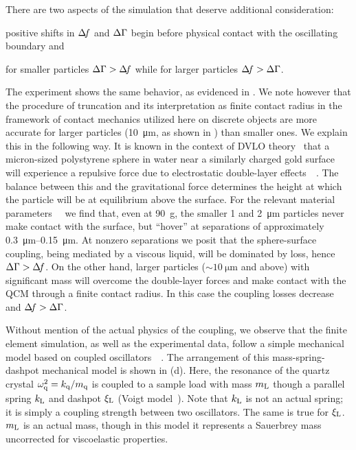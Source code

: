 There are two aspects of the simulation that deserve additional
consideration:
\begin{inparaenum}[(1)]
\item positive shifts in $\Delta\!f$ and $\Delta\Gamma$ begin 
before physical contact with the oscillating boundary and 
\item for smaller particles $\Delta\Gamma>\Delta\!f$ while for
larger particles $\Delta\!f>\Delta\Gamma$.
\end{inparaenum}
The experiment shows the same behavior, as evidenced in
.  We note however that the procedure of truncation
and its interpretation as finite contact radius in the framework of contact
mechanics utilized here on discrete objects are more accurate for larger
particles (\SI{10}{\micro\meter}, as shown in )
than smaller ones.  We explain this in the following way.
It is known in
the context of DVLO theory~\cite{israelachvili2011intermolecular} that a
micron-sized polystyrene sphere in water near a similarly charged gold
surface will experience a repulsive force due to electrostatic double-layer
effects~\cite{alexander1987hydrodynamic}~\cite{flicker1993quantifying}.
The balance between this and the gravitational force determines the height
at which the particle will be at equilibrium above the surface.  For the
relevant material
parameters~\cite{israelachvili2011intermolecular}~\cite{sharma1992factors}
we find that, even at \SI{90}{g}, the smaller \num{1} and
\SI{2}{\micro\meter} particles never make contact with the surface, but
``hover'' at separations of approximately
\SIrange{0.3}{0.15}{\micro\meter}.  At nonzero separations we posit that
the sphere-surface coupling, being mediated by a viscous liquid, will be
dominated by loss, hence $\Delta\Gamma>\Delta\!f$.  On the other hand, larger particles
($\sim\SI{10}{\micro\meter}$ and above) with significant mass will overcome
the double-layer forces and make contact with the QCM through a finite
contact radius.  In this case the coupling losses decrease and $\Delta\!f>\Delta\Gamma$.

Without mention of the actual physics of the coupling, we observe that the
finite element simulation, as well as the experimental data, follow a simple
mechanical model based on coupled
oscillators~\cite{dybwad1985sensitive}~\cite{olsson2012probing}.  The
arrangement of this mass-spring-dashpot mechanical model is shown in
(d).  Here, the resonance of the quartz crystal
$\omega_\mathrm{q}^2=k_\mathrm{q}/m_\mathrm{q}$ is coupled to a sample load with mass $m_\mathrm{L}$ though a
parallel spring $k_\mathrm{L}$ and dashpot $\xi_\mathrm{L}$ (Voigt
model~\cite{sips1950mechanical}).  Note that $k_\mathrm{L}$ is not an actual spring; it
is simply a coupling strength between two oscillators.  The same is true for
$\xi_\mathrm{L}$.  $m_\mathrm{L}$ is an actual mass, though in this model it represents a
Sauerbrey mass uncorrected for viscoelastic properties.  

